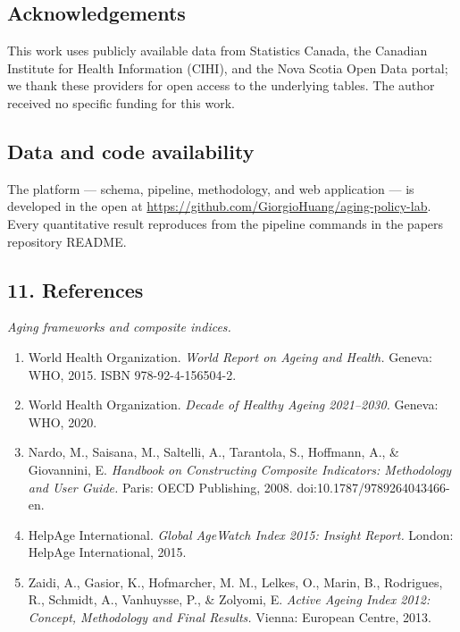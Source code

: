 \documentclass[
  11pt,
]{article}
\providecommand{\tightlist}{%
  \setlength{\itemsep}{0pt}\setlength{\parskip}{0pt}}
\begin{document}
\hypertarget{acknowledgements}{%
\subsection{Acknowledgements}\label{acknowledgements}}

This work uses publicly available data from Statistics Canada, the
Canadian Institute for Health Information (CIHI), and the Nova Scotia
Open Data portal; we thank these providers for open access to the
underlying tables. The author received no specific funding for this
work.

\hypertarget{data-and-code-availability}{%
\subsection{Data and code
availability}\label{data-and-code-availability}}

The platform --- schema, pipeline, methodology, and web application ---
is developed in the open at
\url{https://github.com/GiorgioHuang/aging-policy-lab}. Every
quantitative result reproduces from the pipeline commands in the
paper\textquotesingle s repository README.

\hypertarget{11-references}{%
\subsection{11. References}\label{11-references}}

\emph{Aging frameworks and composite indices.}

\begin{enumerate}
\def\labelenumi{\arabic{enumi}.}
\tightlist
\item
  World Health Organization. \emph{World Report on Ageing and Health.}
  Geneva: WHO, 2015. ISBN 978-92-4-156504-2.
\item
  World Health Organization. \emph{Decade of Healthy Ageing 2021--2030.}
  Geneva: WHO, 2020.
\item
  Nardo, M., Saisana, M., Saltelli, A., Tarantola, S., Hoffmann, A., \&
  Giovannini, E. \emph{Handbook on Constructing Composite Indicators:
  Methodology and User Guide.} Paris: OECD Publishing, 2008.
  doi:10.1787/9789264043466-en.
\item
  HelpAge International. \emph{Global AgeWatch Index 2015: Insight
  Report.} London: HelpAge International, 2015.
\item
  Zaidi, A., Gasior, K., Hofmarcher, M. M., Lelkes, O., Marin, B.,
  Rodrigues, R., Schmidt, A., Vanhuysse, P., \& Zolyomi, E. \emph{Active
  Ageing Index 2012: Concept, Methodology and Final Results.} Vienna:
  European Centre, 2013.
\end{enumerate}
\end{document}
